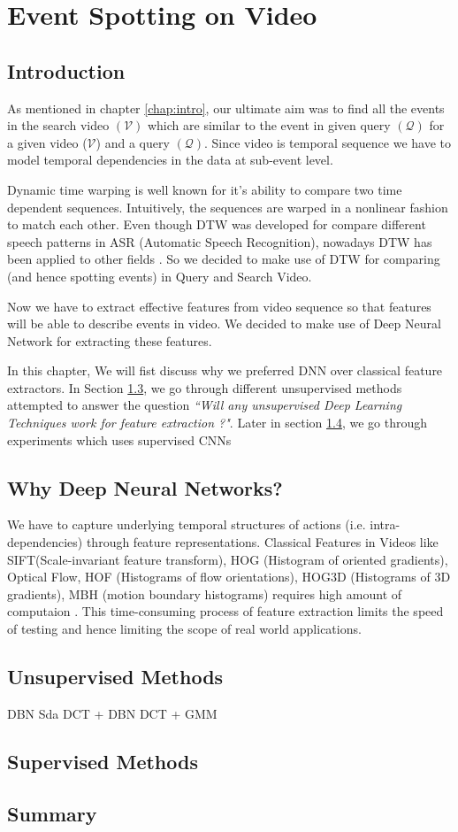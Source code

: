 \chapter{Event Spotting on Video}
\label{chap:event}

\section{Introduction}
As mentioned in chapter \ref{chap:intro}, our ultimate aim was to find all the events in the search video $(\mathcal{V})$ which are similar to the event in given query $(\mathcal{Q})$  for a given video ($\mathcal{V}$) and a query $(\mathcal{Q})$. Since video is temporal sequence we have to model temporal dependencies
in the data at sub-event level. 

Dynamic time warping is well known for it's ability to compare two time dependent sequences. Intuitively, the sequences are warped in a nonlinear fashion to match each other. Even though DTW was developed for compare different speech patterns in ASR (Automatic Speech Recognition), nowadays DTW has been applied to other fields \cite{muller2007information}.  So we decided to make use of DTW for comparing (and hence spotting events) in Query and Search Video.

Now we have to extract effective features from video sequence so that features will be able to describe events  in video. We decided to make use of Deep Neural Network for extracting these features. 

In this chapter, We will fist discuss why we preferred  DNN over classical feature extractors. In Section \ref{sec:event:unsupervised}, we go through different unsupervised methods attempted to answer the question \textit{``Will any unsupervised Deep Learning Techniques work for feature extraction ?"}. Later in section \ref{sec:event:supervised}, we go through experiments which uses supervised CNNs  

\section{Why Deep Neural Networks?}
\label{sec:event:why}
We have to capture underlying temporal structures of actions (i.e. intra-dependencies) through feature representations. Classical Features in Videos like SIFT(Scale-invariant feature transform), HOG (Histogram of oriented gradients), Optical Flow, HOF (Histograms of flow orientations), HOG3D (Histograms of 3D gradients), MBH (motion boundary histograms) requires high amount of computaion \cite{baker2011database,chatfield2011devil}. This time-consuming process of feature extraction limits the speed of testing and hence limiting the scope of real world applications.  

\section{Unsupervised Methods}
\label{sec:event:unsupervised}
DBN
Sda
DCT + DBN 
DCT + GMM
\section{Supervised Methods}
\label{sec:event:supervised}
\section{Summary}
